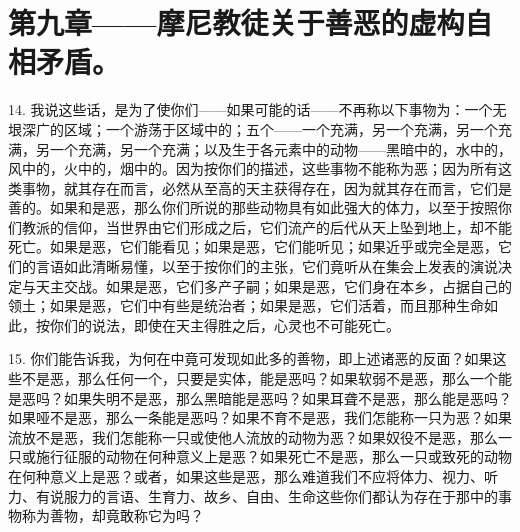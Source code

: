 
\section{第九章——摩尼教徒关于善恶的虚构自相矛盾。}

14. 我说这些话，是为了使你们——如果可能的话——不再称以下事物为：一个无垠深广的区域；一个游荡于区域中的；五个——一个充满，另一个充满，另一个充满，另一个充满，另一个充满；以及生于各元素中的动物——黑暗中的，水中的，风中的，火中的，烟中的。因为按你们的描述，这些事物不能称为恶；因为所有这类事物，就其存在而言，必然从至高的天主获得存在，因为就其存在而言，它们是善的。如果和是恶，那么你们所说的那些动物具有如此强大的体力，以至于按照你们教派的信仰，当世界由它们形成之后，它们流产的后代从天上坠到地上，却不能死亡。如果是恶，它们能看见；如果是恶，它们能听见；如果近乎或完全是恶，它们的言语如此清晰易懂，以至于按你们的主张，它们竟听从在集会上发表的演说决定与天主交战。如果是恶，它们多产子嗣；如果是恶，它们身在本乡，占据自己的领土；如果是恶，它们中有些是统治者；如果是恶，它们活着，而且那种生命如此，按你们的说法，即使在天主得胜之后，心灵也不可能死亡。\par

15. 你们能告诉我，为何在中竟可发现如此多的善物，即上述诸恶的反面？如果这些不是恶，那么任何一个，只要是实体，能是恶吗？如果软弱不是恶，那么一个能是恶吗？如果失明不是恶，那么黑暗能是恶吗？如果耳聋不是恶，那么能是恶吗？如果哑不是恶，那么一条能是恶吗？如果不育不是恶，我们怎能称一只为恶？如果流放不是恶，我们怎能称一只或使他人流放的动物为恶？如果奴役不是恶，那么一只或施行征服的动物在何种意义上是恶？如果死亡不是恶，那么一只或致死的动物在何种意义上是恶？或者，如果这些是恶，那么难道我们不应将体力、视力、听力、有说服力的言语、生育力、故乡、自由、生命这些你们都认为存在于那中的事物称为善物，却竟敢称它为吗？\par

